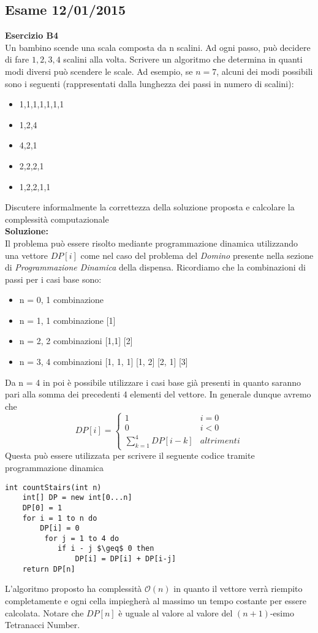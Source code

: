 \documentclass[../cheatSheetAlgoritmi.tex]{subfiles}
\begin{document}
\subsection{Esame 12/01/2015}
\textbf{Esercizio B4}\\
Un bambino scende una scala composta da n scalini. Ad ogni passo, può decidere di fare $1,2,3,4$ scalini alla volta. Scrivere un algoritmo che determina in quanti modi diversi può scendere le scale. Ad esempio, se $n= 7$, alcuni dei modi possibili sono i seguenti (rappresentati dalla lunghezza dei passi in numero di scalini):
\begin{itemize}
	\item 1,1,1,1,1,1,1
	\item 1,2,4
	\item 4,2,1
	\item 2,2,2,1
	\item 1,2,2,1,1
\end{itemize}
Discutere informalmente la correttezza della soluzione proposta e calcolare la complessità computazionale\\
\textbf{Soluzione:}\\
Il problema può essere risolto mediante programmazione dinamica utilizzando una vettore $DP[i]$ come nel caso del problema del \emph{Domino} presente nella sezione di \emph{Programmazione Dinamica} della dispensa. Ricordiamo che la combinazioni di passi per i casi base sono:
\begin{itemize}
	\item n = 0, 1 combinazione
	\item n = 1, 1 combinazione 	[1]
	\item n = 2, 2 combinazioni	[1,1] [2]
	\item n = 3, 4 combinazioni	[1, 1, 1] [1, 2] [2, 1] [3]
\end{itemize}
Da n = 4 in poi è possibile utilizzare i casi base già presenti in quanto saranno pari alla somma dei precedenti 4 elementi del vettore. In generale dunque avremo che 
\begin{equation*}
  	DP[i]=\begin{cases}
  		1 & \text{$i = 0$}\\
  		0 & \text{$i < 0$}\\
  		\sum_{k = 1}^{4}{DP[i-k]} & \text{$altrimenti$}
  	\end{cases}
\end{equation*}
Questa può essere utilizzata per scrivere il seguente codice tramite programmazione dinamica
\begin{lstlisting}[caption=modi per scendere le scale]
int countStairs(int n)
	int[] DP = new int[0...n]
	DP[0] = 1
	for i = 1 to n do
		DP[i] = 0
		 for j = 1 to 4 do
		 	if i - j $\geq$ 0 then
		 		DP[i] = DP[i] + DP[i-j]
	return DP[n]
\end{lstlisting}
L'algoritmo proposto ha complessità $\mathcal{O}(n)$ in quanto il vettore verrà riempito completamente e ogni cella impiegherà al massimo un tempo costante per essere calcolata. Notare che $DP[n]$ è uguale al valore al valore del $(n+1)$-esimo Tetranacci Number.
\newpage
\end{document}
